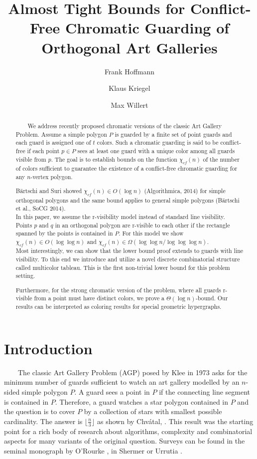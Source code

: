 \documentclass[a4paper,USenglish,numberwithinsect]{lipics}
\title{Almost Tight Bounds for  Conflict-Free Chromatic Guarding of Orthogonal Art Galleries}
\author[1]{Frank Hoffmann}
\author[1]{Klaus Kriegel}
\author[1]{Max Willert}
\affil[1]{Freie Universit\"at Berlin, Institut f\"ur Informatik, 14195 Berlin, Germany\\
  \texttt{\{hoffmann,kriegel,willerma\}@mi.fu-berlin.de}}
\theoremstyle{plain}
\begin{document}
\maketitle

\begin{abstract}
\ \ \ \ We address recently proposed chromatic versions of the
classic Art Gallery Problem. Assume a 
simple  polygon $P$ is guarded by a finite set of point guards and each
guard is assigned one of $t$ colors. Such a chromatic guarding is said to be
conflict-free if each point $p\in P$ sees at least one guard with a
unique color among all guards visible from $p$. The goal is to establish
bounds on the function $\chi_{cf}(n)$ of the number of colors sufficient
to guarantee the existence of a conflict-free chromatic guarding for any
$n$-vertex polygon.

 B\"artschi and Suri showed  $\chi_{cf}(n)\in O(\log n)$ (Algorithmica,
2014) for simple orthogonal polygons and the same bound applies to
general simple polygons (B\"artschi et al., SoCG 2014).\\
In this paper, we assume the r-visibility model
instead of standard line visibility. Points $p$ and $q$ in an orthogonal polygon  are r-visible to
each other if the rectangle spanned by the points is contained in $P$.
For this model we show  $\chi_{cf}(n)\in O(\log\log n)$ and
$\chi_{cf}(n)\in \Omega(\log\log n /\log\log\log n)$.\\
Most interestingly, we can show that the lower bound proof extends to guards with line visibility. 
To this end we introduce and utilize a novel discrete combinatorial structure called multicolor tableau. This is the first non-trivial lower bound for this problem setting.

Furthermore, for the strong chromatic version of the problem, where all
guards r-visible from a point must have distinct colors, we prove a
$\Theta(\log n)$-bound.
Our results can be interpreted as coloring results for special
geometric hypergraphs.

\end{abstract}

\section{Introduction}

\ \ \ \ The classic Art Gallery Problem (AGP) posed by Klee in 1973 asks for the
minimum number of guards sufficient to watch an art gallery modelled by
an $n$-sided simple polygon $P$. A  guard sees a point in $P$ if the
connecting line segment is contained in $P$. Therefore, a guard
watches a star polygon contained in $P$ and the question is to cover $P$
by a collection of stars with smallest possible cardinality. The answer
is $\lfloor \frac{n}{3}\rfloor$ as shown by Chv\'atal, \cite{Ch}. This result was
the starting point for a rich body of research about algorithms,
complexity and combinatorial aspects for many variants of the original
question. Surveys can be found in the seminal monograph by O'Rourke
\cite{ORourke}, in Shermer \cite{Sh} or Urrutia \cite{Ur}. 
\end{document}
